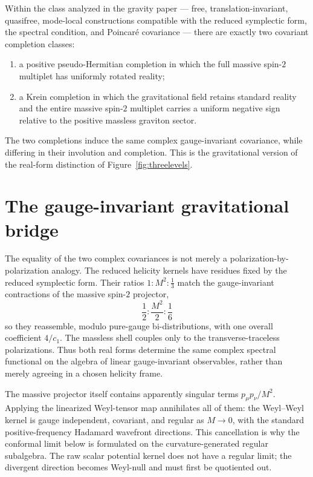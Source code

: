 \documentclass[11pt]{article}
\theoremstyle{remark}
\begin{document}
Within the class analyzed in the gravity paper \cite{paperIV} --- free,
translation-invariant, quasifree, mode-local constructions compatible
with the reduced symplectic form, the spectral condition, and Poincar\'e
covariance --- there are exactly two covariant completion classes:
\begin{enumerate}
\item a positive pseudo-Hermitian completion in which the full massive
spin-$2$ multiplet has uniformly rotated reality;
\item a Krein completion in which the gravitational field retains
standard reality and the entire massive spin-$2$ multiplet carries a
uniform negative sign relative to the positive massless graviton sector.
\end{enumerate}
The two completions induce the same complex gauge-invariant covariance,
while differing in their involution and completion.  This is the
gravitational version of the real-form distinction of
Figure~\ref{fig:threelevels}.

\section{The gauge-invariant gravitational bridge}
\label{sec:gravitybridge}

The equality of the two complex covariances is not merely a
polarization-by-polarization analogy.  The reduced helicity kernels have
residues fixed by the reduced symplectic form.  Their ratios
$1:M^2:\tfrac13$ match the gauge-invariant contractions of the massive
spin-$2$ projector,
\begin{equation}
\frac12:\frac{M^2}{2}:\frac16
\end{equation}
so they reassemble, modulo pure-gauge bi-distributions, with one overall
coefficient $4/c_1$.  The massless
shell couples only to the transverse-traceless polarizations.  Thus both
real forms determine the same complex spectral functional on the algebra
of linear gauge-invariant observables, rather than merely agreeing in a
chosen helicity frame.

The massive projector itself contains apparently singular terms
$p_\mu p_\nu/M^2$.  Applying the linearized Weyl-tensor map annihilates
all of them: the Weyl--Weyl kernel is gauge independent, covariant, and
regular as $M\to0$, with the standard positive-frequency Hadamard
wavefront directions.  This cancellation is why the conformal limit
below is formulated on the curvature-generated regular subalgebra.  The
raw scalar potential kernel does not have a regular limit; the divergent
direction becomes Weyl-null and must first be quotiented out.
\end{document}
